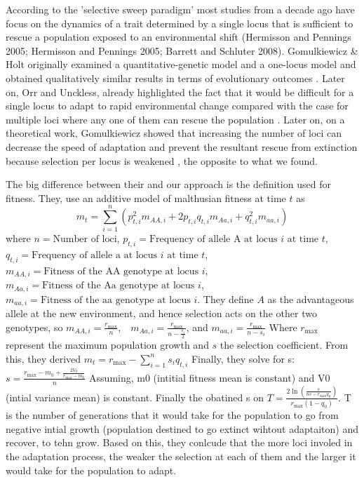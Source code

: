 \documentclass{article}
\begin{document}
According to the 'selective sweep paradigm' most studies from a decade ago have focus on the dynamics of a trait determined by a single locus that is sufficient to rescue a population exposed to an environmental shift (Hermisson and Pennings 2005;  Hermisson and Pennings 2005; Barrett and Schluter 2008). Gomulkiewicz \& Holt  originally examined a quantitative-genetic model and a one-locus model  and obtained qualitatively similar results in terms of evolutionary outcomes \citep{Gomulkiewicz1995-sj}.  Later on, Orr and Unckless, already highlighted the fact that it would be difficult for a single locus to adapt to rapid environmental change compared with the case for multiple loci where any one of them can rescue the population \citep{Orr2014-yn}. Later on,  on a theoretical work, Gomulkiewicz showed that increasing the number of loci can decrease the speed of adaptation and prevent the resultant rescue from extinction because selection per locus is weakened \citep{Gomulkiewicz2010-wr}, the opposite to what we found.

The big difference between their and our approach is the definition used for fitness. They, use an additive model of malthusian fitness at time $t$ as
\[
m_t = \sum_{i=1}^{n} \left( p_{t,i}^2 m_{AA,i} + 2p_{t,i} q_{t,i} m_{Aa,i} + q_{t,i}^2 m_{aa,i} \right)
\]
where  
$n = \text{Number of loci}$, $p_{t,i} = \text{Frequency of allele A at locus } i \text{ at time } t$, 
$q_{t,i} = \text{Frequency of allele a at locus } i \text{ at time } t$, $m_{AA,i} = \text{Fitness of the AA genotype at locus } i$,
$m_{Aa,i} = \text{Fitness of the Aa genotype at locus } i$,
$m_{aa,i} = \text{Fitness of the aa genotype at locus } i $. They define $A$ as the advantageous allele at the new environment, and hence selection acts on the other two genotypes, so $m_{AA,i} = \frac{r_{\text{max}}}{n}$, $\text{ } m_{Aa,i} = \frac{r_{\text{max}}}{n - \frac{s_i}{2}} $, and $m_{aa,i} = \frac{r_{\text{max}}}{n - s_i} $
Where $r_{\text{max}}$ represent the maximum population growth and $s$ the selection coefficient. From this, they derived $m_t = r_{\text{max}} - \sum_{i=1}^{n} s_i q_{t,i}$
Finally, they solve for s: 
$s = \frac{r_{\text{max}} - m_0 + \frac{2V_0}{r_{\text{max}} - m_0}}{n}$ Assuming, m0 (intitial fitness mean is constant) and V0 (intial variance mean) is constant. Finally the obatined s on  $T = \frac{2 \ln(\frac{s}{ns - r_{\text{max}} q_0})}{r_{\text{max}}(1 - q_0)}
$. T is the number of generations that it would take for the population to go from negative intial growth (population destined to go extinct wihtout adaptaiton) and recover, to tehn grow. Based on this, they conlcude that the more loci involed in the adaptation process, the weaker the selection at each of them and the larger it would take for the population to adapt. 
\end{document}

